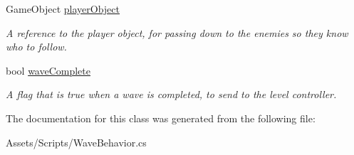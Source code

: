 \begin{DoxyCompactItemize}
\mbox{\label{class_wave_behavior_a97c0d24bc7af3d86d245206339a04d1f}} 
Game\+Object \mbox{\hyperlink{class_wave_behavior_a97c0d24bc7af3d86d245206339a04d1f}{player\+Object}}
\begin{DoxyCompactList}\small\item\em A reference to the player object, for passing down to the enemies so they know who to follow. \end{DoxyCompactList}\item 
\mbox{\label{class_wave_behavior_a32d9c8126e7d2cf877476eca635f50c6}} 
bool \mbox{\hyperlink{class_wave_behavior_a32d9c8126e7d2cf877476eca635f50c6}{wave\+Complete}}
\begin{DoxyCompactList}\small\item\em A flag that is true when a wave is completed, to send to the level controller. \end{DoxyCompactList}\end{DoxyCompactItemize}


The documentation for this class was generated from the following file\+:\begin{DoxyCompactItemize}
\item 
Assets/\+Scripts/Wave\+Behavior.\+cs\end{DoxyCompactItemize}
